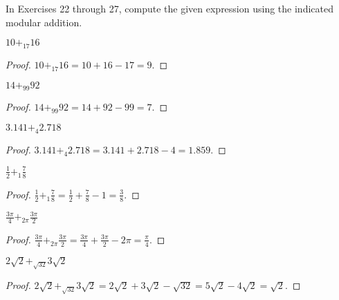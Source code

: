 In Exercises 22 through 27, compute the given expression using the indicated modular addition.

\begin{exercise}
    $10 {+}_{17} 16$
\end{exercise}

\begin{proof}
    $10 {+}_{17} 16 = 10 + 16 - 17 = 9$.
\end{proof}

\begin{exercise}
    $14 {+}_{99} 92$
\end{exercise}

\begin{proof}
    $14 {+}_{99} 92 = 14 + 92 - 99 = 7$.
\end{proof}

\begin{exercise}
    $3.141 {+}_{4} 2.718$
\end{exercise}

\begin{proof}
    $3.141 {+}_{4} 2.718 = 3.141 + 2.718 - 4 = 1.859$.
\end{proof}

\begin{exercise}
    $\frac{1}{2} {+}_{1} \frac{7}{8}$
\end{exercise}

\begin{proof}
    $\frac{1}{2} {+}_{1} \frac{7}{8} = \frac{1}{2} + \frac{7}{8} - 1 = \frac{3}{8}$.
\end{proof}

\begin{exercise}
    $\frac{3\pi}{4} {+}_{2\pi} \frac{3\pi}{2}$
\end{exercise}

\begin{proof}
    $\frac{3\pi}{4} {+}_{2\pi} \frac{3\pi}{2} = \frac{3\pi}{4} + \frac{3\pi}{2} - 2\pi = \frac{\pi}{4}$.
\end{proof}

\begin{exercise}
    $2\sqrt{2} {+}_{\sqrt{32}} 3\sqrt{2}$
\end{exercise}

\begin{proof}
    $2\sqrt{2} {+}_{\sqrt{32}} 3\sqrt{2} = 2\sqrt{2} + 3\sqrt{2} - \sqrt{32} = 5\sqrt{2} - 4\sqrt{2} = \sqrt{2}$.
\end{proof}

